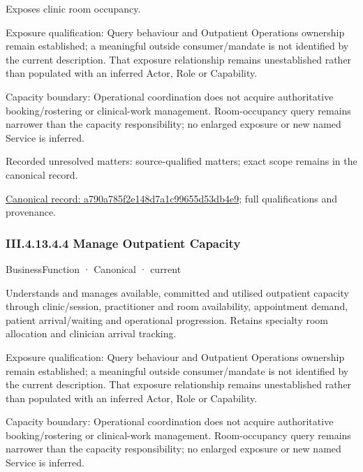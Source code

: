 Exposes clinic room occupancy.



Exposure qualification: Query behaviour and Outpatient Operations ownership remain established; a meaningful outside consumer/mandate is not identified by the current description. That exposure relationship remains unestablished rather than populated with an inferred Actor, Role or Capability.



Capacity boundary: Operational coordination does not acquire authoritative booking/rostering or clinical-work management. Room-occupancy query remains narrower than the capacity responsibility; no enlarged exposure or new named Service is inferred.


{\small Recorded unresolved matters: source-qualified matters; exact scope remains in the canonical record.}\par
{\footnotesize \href{../../../../../../../../continuum/business/business-service/a790a785f2e148d7a1c99655d53db4e9.md}{Canonical record: a790a785f2e148d7a1c99655d53db4e9}; full qualifications and provenance.}\par
\subsubsection*{III.4.13.4.4 Manage Outpatient Capacity}
\label{navigation:III.4.13.4.4}

\label{element:45fd6190b7334f838575881725f6a66b}
{\small BusinessFunction · Canonical · current}\par

Understands and manages available, committed and utilised outpatient capacity through clinic/session, practitioner and room availability, appointment demand, patient arrival/waiting and operational progression. Retains specialty room allocation and clinician arrival tracking.



Exposure qualification: Query behaviour and Outpatient Operations ownership remain established; a meaningful outside consumer/mandate is not identified by the current description. That exposure relationship remains unestablished rather than populated with an inferred Actor, Role or Capability.



Capacity boundary: Operational coordination does not acquire authoritative booking/rostering or clinical-work management. Room-occupancy query remains narrower than the capacity responsibility; no enlarged exposure or new named Service is inferred.


